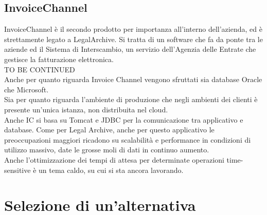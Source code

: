 \subsection{InvoiceChannel}
InvoiceChannel è il secondo prodotto per importanza all'interno dell'azienda, ed è strettamente legato a LegalArchive.
Si tratta di un software che fa da ponte tra le aziende ed il Sistema di Interscambio, un servizio dell'Agenzia delle Entrate che gestisce la fatturazione elettronica.\\
TO BE CONTINUED\\
Anche per quanto riguarda Invoice Channel vengono sfruttati sia database Oracle che Microsoft.\\
Sia per quanto riguarda l'ambiente di produzione che negli ambienti dei clienti è presente un'unica istanza, non distribuita nel cloud.\\
Anche IC si basa su Tomcat e JDBC per la comunicazione tra applicativo e database.
Come per Legal Archive, anche per questo applicativo le preoccupazioni maggiori ricadono su scalabilità e performance in condizioni di utilizzo massivo, date le grosse moli di dati in continuo aumento.\\
Anche l'ottimizzazione dei tempi di attesa per determinate operazioni time-sensitive è un tema caldo, su cui si sta ancora lavorando.\\




\section{Selezione di un'alternativa}

